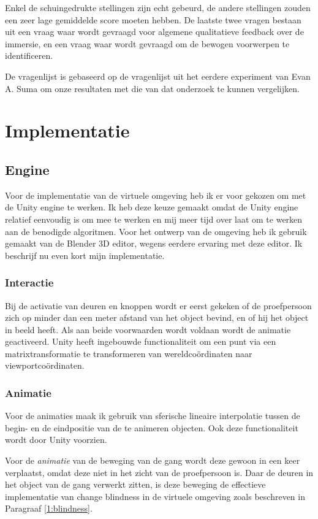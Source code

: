 Enkel de schuingedrukte stellingen zijn echt gebeurd, de andere stellingen zouden
een zeer lage gemiddelde score moeten hebben. De laatste twee vragen bestaan uit 
een vraag waar wordt gevraagd voor algemene qualitatieve feedback over de 
immersie, en een vraag waar wordt gevraagd om de bewogen voorwerpen te 
identificeren.

De vragenlijst is gebaseerd op de vragenlijst uit het eerdere experiment van Evan
A. Suma\cite{suma11} om onze resultaten met die van dat onderzoek te kunnen 
vergelijken.


\section{Implementatie}
\subsection{Engine}
Voor de implementatie van de virtuele omgeving heb ik er voor gekozen om met de
Unity engine te werken. Ik heb deze keuze gemaakt omdat de Unity engine relatief
eenvoudig is om mee te werken en mij meer tijd over laat om te werken aan de
benodigde algoritmen. Voor het ontwerp van de omgeving heb ik gebruik gemaakt 
van de Blender 3D editor, wegens eerdere ervaring met deze editor. Ik beschrijf 
nu even kort mijn implementatie.


\subsubsection{Interactie}
Bij de activatie van deuren en knoppen wordt er eerst gekeken of de proefpersoon
zich op minder dan een meter afstand van het object bevind, en of hij het object
in beeld heeft. Als aan beide voorwaarden wordt voldaan wordt de animatie
geactiveerd. Unity heeft ingebouwde functionaliteit om een punt via een
matrixtransformatie te transformeren van wereldco\"ordinaten naar 
viewportco\"ordinaten.


\subsubsection{Animatie}
Voor de animaties maak ik gebruik van sferische lineaire interpolatie tussen de
begin- en de eindpositie van de te animeren objecten. Ook deze functionaliteit
wordt door Unity voorzien.

Voor de \emph{animatie} van de beweging van de gang wordt deze gewoon in een keer
verplaatst, omdat deze niet in het zicht van de proefpersoon is. Daar de deuren 
in het object van de gang verwerkt zitten, is deze beweging de effectieve
implementatie van change blindness in de virtuele omgeving zoals beschreven in
Paragraaf \ref{1:blindness}.


